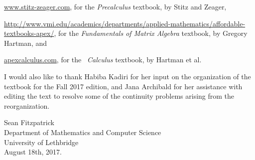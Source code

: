\bigskip


\href{http://www.stitz-zeager.com}{www.stitz-zeager.com}, for the \textit{Precalculus} textbook, by Stitz and Zeager, 

\bigskip

\href{http://www.vmi.edu/academics/departments/applied-mathematics/affordable-textbooks-apex/}{http://www.vmi.edu/academics/departments/applied-mathematics/affordable-textbooks-apex/}, for the \textit{Fundamentals of Matrix Algebra} textbook, by Gregory Hartman, and

\bigskip

\href{http://www.apexcalculus.com}{apexcalculus.com}, for the \apex\ \textit{Calculus} textbook, by Hartman et al.

I would also like to thank Habiba Kadiri for her input on the organization of the textbook for the Fall 2017 edition, and Jana Archibald for her assistance with editing the text to resolve some of the continuity problems arising from the reorganization.

\vspace{1in}

\begin{raggedright}
Sean Fitzpatrick\\
Department of Mathematics and Computer Science\\
University of Lethbridge\\
August 18th, 2017.
\end{raggedright}




